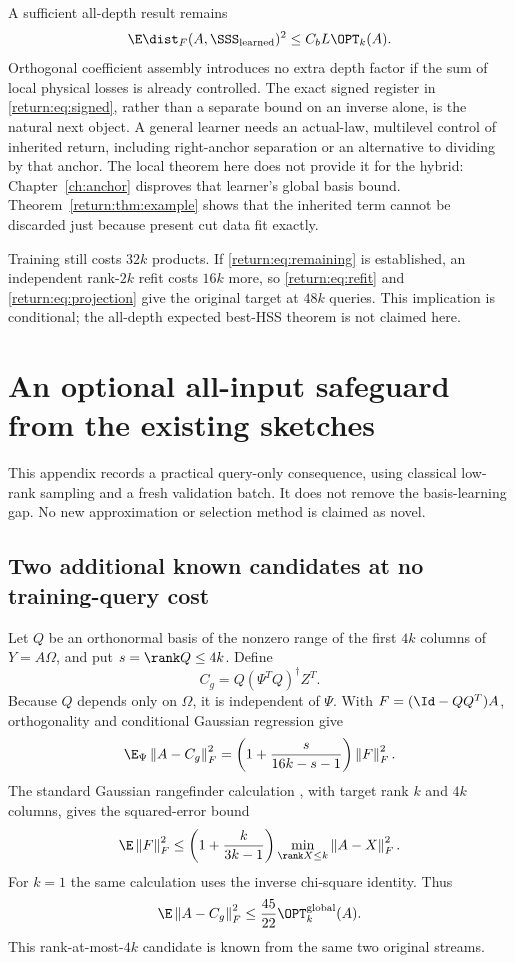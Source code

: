 \documentclass[11pt,oneside,openany,a4paper]{book}
\numberwithin{equation}{chapter}
\theoremstyle{definition}
\theoremstyle{remark}
\newcommand{\F}[1]{\left\lVert#1\right\rVert_F}
\begin{document}
A sufficient all-depth result remains
\begin{equation}\label{return:eq:remaining}
 \E\dist_F(A,\SSS_{\rm learned})^2\le C_bL\OPT_k(A).
\end{equation}
Orthogonal coefficient assembly introduces no extra depth factor if the sum of local physical losses is already controlled. The exact signed register in \eqref{return:eq:signed}, rather than a separate bound on an inverse alone, is the natural next object. A general learner needs an actual-law, multilevel control of inherited return, including right-anchor separation or an alternative to dividing by that anchor. The local theorem here does not provide it for the hybrid: Chapter~\ref{ch:anchor} disproves that learner's global basis bound. Theorem~\ref{return:thm:example} shows that the inherited term cannot be discarded just because present cut data fit exactly.

Training still costs $32k$ products. If \eqref{return:eq:remaining} is established, an independent rank-$2k$ refit costs $16k$ more, so \eqref{return:eq:refit} and \eqref{return:eq:projection} give the original target at $48k$ queries. This implication is conditional; the all-depth expected best-HSS theorem is not claimed here.


\section{An optional all-input safeguard from the existing sketches}
This appendix records a practical query-only consequence, using classical low-rank sampling and a fresh validation batch. It does not remove the basis-learning gap. No new approximation or selection method is claimed as novel.

\subsection{Two additional known candidates at no training-query cost}
Let $Q$ be an orthonormal basis of the nonzero range of the first $4k$ columns of $Y=A\Omega$, and put $s=\rank Q\le4k$. Define
\[
 C_g=Q(\Psi^TQ)^\dagger Z^T.
\]
Because $Q$ depends only on $\Omega$, it is independent of $\Psi$. With $F=(\Id-QQ^T)A$, orthogonality and conditional Gaussian regression give
\[
 \E_\Psi\F{A-C_g}^2
   =\left(1+\frac{s}{16k-s-1}\right)\F F^2.
\]
The standard Gaussian rangefinder calculation \cite{HMT}, with target rank $k$ and $4k$ columns, gives the squared-error bound
\[
 \E\F F^2\le\left(1+\frac{k}{3k-1}\right)
            \min_{\rank X\le k}\F{A-X}^2.
\]
For $k=1$ the same calculation uses the inverse chi-square identity. Thus
\begin{equation}\label{return:eq:globalguard}
 \E\F{A-C_g}^2\le\frac{45}{22}\OPT_k^{\rm global}(A).
\end{equation}
This rank-at-most-$4k$ candidate is known from the same two original streams.
\end{document}
